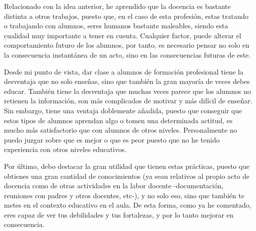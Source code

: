 \documentclass[spanish,12pt, a4paper,twoside]{paper}
\begin{document}
Relacionado con la idea anterior, he aprendido que la docencia es bastante distinta a otros trabajos, puesto que, en el caso de esta profesión, estas tratando o trabajando con alumnos, seres humanos bastante maleables, siendo esta cualidad muy importante a tener en cuenta. Cualquier factor, puede alterar el comportamiento futuro de los alumnos, por tanto, es necesario pensar no solo en la consecuencia instantánea de un acto, sino en las consecuencias futuras de este.

Desde mi punto de vista, dar clase a alumnos de formación profesional tiene la desventaja que no solo enseñas, sino que también la gran mayoría de veces debes educar. También tiene la desventaja que muchas veces parece que los alumnos no retienen la información, son más complicados de motivar y más difícil de enseñar. Sin embargo, tiene una ventaja doblemente añadida, puesto que conseguir que estos tipos de alumnos aprendan algo o tomen una determinada actitud, es mucho más satisfactorio que con alumnos de otros niveles. Personalmente no puedo juzgar sobre que es mejor o que es peor puesto que no he tenido experiencia con otros niveles educativos.

Por último, debo destacar la gran utilidad que tienen estas prácticas, puesto que obtienes una gran cantidad de conocimientos (ya sean relativos al propio acto de docencia como de otras actividades en la labor docente -documentación, reuniones con padres y otros docentes, etc-), y no solo eso, sino que también te metes en el contexto educativo en el aula. De esta forma, como ya he comentado, eres capaz de ver tus debilidades y tus fortalezas, y por lo tanto mejorar en consecuencia.
\end{document}
